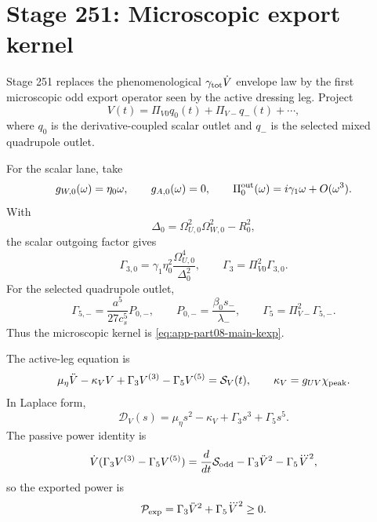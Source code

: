 \section{Stage 251: Microscopic export kernel}
\label{sec:app-part08:microscopic-export-kernel}
\label{stage:251}


Stage 251 replaces the phenomenological \(\gamma_{\rm tot}\dot V\) envelope law by the first microscopic odd export operator seen by the active dressing leg.  Project
\begin{equation}
\label{eq:app-part08-stage251-v-projection}
V(t)=\Pi_{V0}q_0(t)+\Pi_{V-}q_-(t)+\cdots,
\end{equation}
where \(q_0\) is the derivative-coupled scalar outlet and \(q_-\) is the selected mixed quadrupole outlet.

For the scalar lane, take
\begin{equation}
\label{eq:app-part08-stage251-scalar-coupling}
g_{W,0}(\omega)=\eta_0\omega,
\qquad
g_{A,0}(\omega)=0,
\qquad
\Pi_0^{\rm out}(\omega)=i\gamma_1\omega+O(\omega^3).
\end{equation}
With
\begin{equation}
\label{eq:app-part08-stage251-delta0}
\Delta_0=\Omega_{U,0}^2\Omega_{W,0}^2-R_0^2,
\end{equation}
the scalar outgoing factor gives
\begin{equation}
\label{eq:app-part08-stage251-gamma30}
\Gamma_{3,0}=\gamma_1\eta_0^2\frac{\Omega_{U,0}^4}{\Delta_0^2},
\qquad
\Gamma_3=\Pi_{V0}^{2}\Gamma_{3,0}.
\end{equation}
For the selected quadrupole outlet,
\begin{equation}
\label{eq:app-part08-stage251-gamma5}
\Gamma_{5,-}=\frac{a^5}{27c_s^5}P_{0,-},
\qquad
P_{0,-}=\frac{\beta_0s_-}{\lambda_-},
\qquad
\Gamma_5=\Pi_{V-}^{2}\Gamma_{5,-}.
\end{equation}
Thus the microscopic kernel is \cref{eq:app-part08-main-kexp}.

The active-leg equation is
\begin{equation}
\label{eq:app-part08-stage251-active-equation}
\mu_\eta\ddot V-\kappa_VV+
\Gamma_3V^{(3)}-
\Gamma_5V^{(5)}=
\mathcal S_V(t),
\qquad
\kappa_V=g_{UV}\chi_{\rm peak}.
\end{equation}
In Laplace form,
\begin{equation}
\label{eq:app-part08-stage251-laplace-d}
\mathcal D_V(s)=\mu_\eta s^2-\kappa_V+\Gamma_3s^3+\Gamma_5s^5.
\end{equation}
The passive power identity is
\begin{equation}
\label{eq:app-part08-stage251-power-identity}
\dot V(\Gamma_3V^{(3)}-\Gamma_5V^{(5)})
=
\frac{d}{dt}\mathcal S_{\rm odd}
-
\Gamma_3\ddot V^{2}
-
\Gamma_5\dddot V^{2},
\end{equation}
so the exported power is
\begin{equation}
\label{eq:app-part08-stage251-export-power}
\mathcal P_{\rm exp}=\Gamma_3\ddot V^{2}+\Gamma_5\dddot V^{2}\ge0.
\end{equation}

